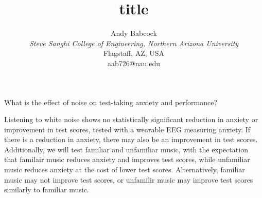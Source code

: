 \documentclass[journal]{IEEEtran}
\begin{document}
\title{title}

\author{Andy Babcock \\
    \textit{Steve Sanghi College of Engineering, Northern Arizona University} \\
    Flagstaff, AZ, USA \\
    aab726@nau.edu
}

\maketitle
What is the effect of noise on test-taking anxiety and performance?

Listening to white noise shows no statistically significant reduction in anxiety or improvement in test scores, tested with a wearable EEG measuring anxiety. If there is a reduction in anxiety, there may also be an improvement in test scores. Additionally, we will test familiar and unfamiliar music, with the expectation that familair music reduces anxiety and improves test scores, while unfamiliar music reduces anxiety at the cost of lower test scores. Alternatively, familiar music may not improve test scores, or unfamilir music may improve test scores similarly to familiar music.



\end{document}

